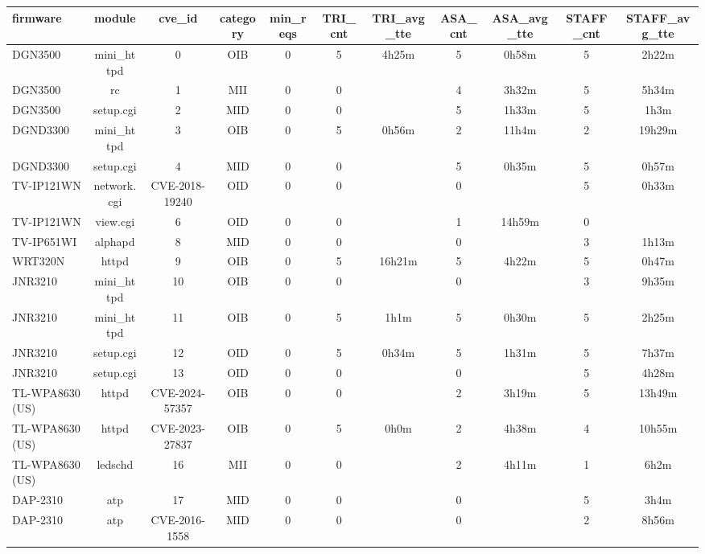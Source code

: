 \begin{table}[ht]
\centering
\renewcommand{\arraystretch}{1.06}
\setlength{\tabcolsep}{4pt}
\begin{tabular}{|l||c|c|c|c|c|c|c|c|c|c|}
\hline
{\sc firmware} & {\sc module} & {\sc cve\_id} & {\sc category} & {\sc min\_reqs} & {\sc TRI\_cnt} & {\sc TRI\_avg\_tte} & {\sc ASA\_cnt} & {\sc ASA\_avg\_tte} & {\sc STAFF\_cnt} & {\sc STAFF\_avg\_tte} \\
\toprule
\hline
DGN3500 & mini\_httpd & 0 & OIB & 0 & 5 & 4h25m & 5 & 0h58m & 5 & 2h22m \\
\hline
DGN3500 & rc & 1 & MII & 0 & 0 &  & 4 & 3h32m & 5 & 5h34m \\
\hline
DGN3500 & setup.cgi & 2 & MID & 0 & 0 &  & 5 & 1h33m & 5 & 1h3m \\
\hline
DGND3300 & mini\_httpd & 3 & OIB & 0 & 5 & 0h56m & 2 & 11h4m & 2 & 19h29m \\
\hline
DGND3300 & setup.cgi & 4 & MID & 0 & 0 &  & 5 & 0h35m & 5 & 0h57m \\
\hline
TV-IP121WN & network.cgi & CVE-2018-19240 & OID & 0 & 0 &  & 0 &  & 5 & 0h33m \\
\hline
TV-IP121WN & view.cgi & 6 & OID & 0 & 0 &  & 1 & 14h59m & 0 &  \\
\hline
TV-IP651WI & alphapd & 8 & MID & 0 & 0 &  & 0 &  & 3 & 1h13m \\
\hline
WRT320N & httpd & 9 & OIB & 0 & 5 & 16h21m & 5 & 4h22m & 5 & 0h47m \\
\hline
JNR3210 & mini\_httpd & 10 & OIB & 0 & 0 &  & 0 &  & 3 & 9h35m \\
\hline
JNR3210 & mini\_httpd & 11 & OIB & 0 & 5 & 1h1m & 5 & 0h30m & 5 & 2h25m \\
\hline
JNR3210 & setup.cgi & 12 & OID & 0 & 5 & 0h34m & 5 & 1h31m & 5 & 7h37m \\
\hline
JNR3210 & setup.cgi & 13 & OID & 0 & 0 &  & 0 &  & 5 & 4h28m \\
\hline
TL-WPA8630 (US) & httpd & CVE-2024-57357 & OIB & 0 & 0 &  & 2 & 3h19m & 5 & 13h49m \\
\hline
TL-WPA8630 (US) & httpd & CVE-2023-27837 & OIB & 0 & 5 & 0h0m & 2 & 4h38m & 4 & 10h55m \\
\hline
TL-WPA8630 (US) & ledschd & 16 & MII & 0 & 0 &  & 2 & 4h11m & 1 & 6h2m \\
\hline
DAP-2310 & atp & 17 & MID & 0 & 0 &  & 0 &  & 5 & 3h4m \\
\hline
DAP-2310 & atp & CVE-2016-1558 & MID & 0 & 0 &  & 0 &  & 2 & 8h56m \\

\end{tabular}
\end{table}
